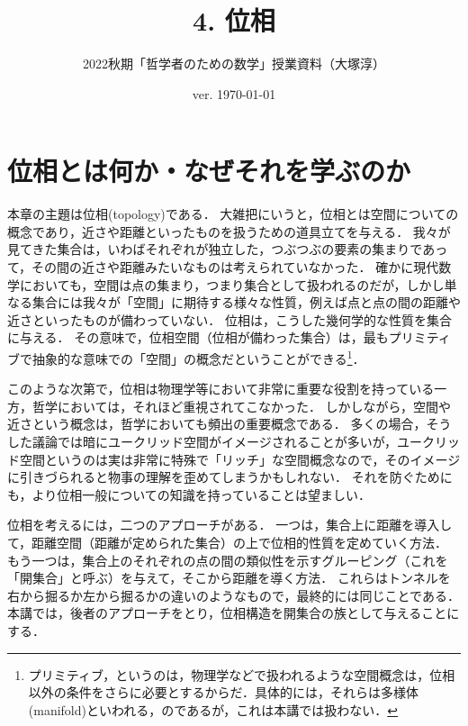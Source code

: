 \documentclass[11pt,a4paper]{jsarticle}
\begin{document}
\title{4. 位相}
\author{2022秋期「哲学者のための数学」授業資料（大塚淳）}
\date{ver. \today}
\maketitle

\section{位相とは何か・なぜそれを学ぶのか}

本章の主題は位相(topology)である．
大雑把にいうと，位相とは空間についての概念であり，近さや距離といったものを扱うための道具立てを与える．
我々が見てきた集合は，いわばそれぞれが独立した，つぶつぶの要素の集まりであって，その間の近さや距離みたいなものは考えられていなかった．
確かに現代数学においても，空間は点の集まり，つまり集合として扱われるのだが，しかし単なる集合には我々が「空間」に期待する様々な性質，例えば点と点の間の距離や近さといったものが備わっていない．
位相は，こうした幾何学的な性質を集合に与える．
その意味で，位相空間（位相が備わった集合）は，最もプリミティブで抽象的な意味での「空間」の概念だということができる\footnote{プリミティブ，というのは，物理学などで扱われるような空間概念は，位相以外の条件をさらに必要とするからだ．具体的には，それらは多様体(manifold)といわれる，のであるが，これは本講では扱わない．}．

このような次第で，位相は物理学等において非常に重要な役割を持っている一方，哲学においては，それほど重視されてこなかった．
しかしながら，空間や近さという概念は，哲学においても頻出の重要概念である．
多くの場合，そうした議論では暗にユークリッド空間がイメージされることが多いが，ユークリッド空間というのは実は非常に特殊で「リッチ」な空間概念なので，そのイメージに引きづられると物事の理解を歪めてしまうかもしれない．
それを防ぐためにも，より位相一般についての知識を持っていることは望ましい．

位相を考えるには，二つのアプローチがある．
一つは，集合上に距離を導入して，距離空間（距離が定められた集合）の上で位相的性質を定めていく方法．
もう一つは，集合上のそれぞれの点の間の類似性を示すグルーピング（これを「開集合」と呼ぶ）を与えて，そこから距離を導く方法．
これらはトンネルを右から掘るか左から掘るかの違いのようなもので，最終的には同じことである．
本講では，後者のアプローチをとり，位相構造を開集合の族として与えることにする．

\end{document}
